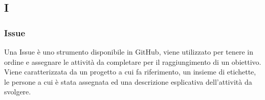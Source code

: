 \subsection{I}

\subsubsection{Issue}
Una Issue è uno strumento disponibile in GitHub\g, viene utilizzato per tenere in ordine e assegnare le attività da
completare per il raggiungimento di un obiettivo.\\
Viene caratterizzata da un progetto a cui fa riferimento, un insieme di etichette, le persone a cui è stata assegnata ed una descrizione esplicativa dell'attività da svolgere.